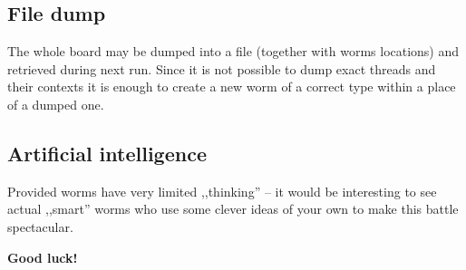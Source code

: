 \documentclass{article}
\begin{document}
\subsection{File dump}

The whole board may be dumped into a file (together with worms locations)
and retrieved during next run. Since it is not possible to dump exact threads
and their contexts it is enough to create a new worm of a correct type
within a place of a dumped one.

\subsection{Artificial intelligence}

Provided worms have very limited ,,thinking'' -- it would be interesting to see
actual ,,smart'' worms who use some clever ideas of your own to make this
battle spectacular.


\vspace{1cm}
\textbf{Good luck!}
\end{document}
